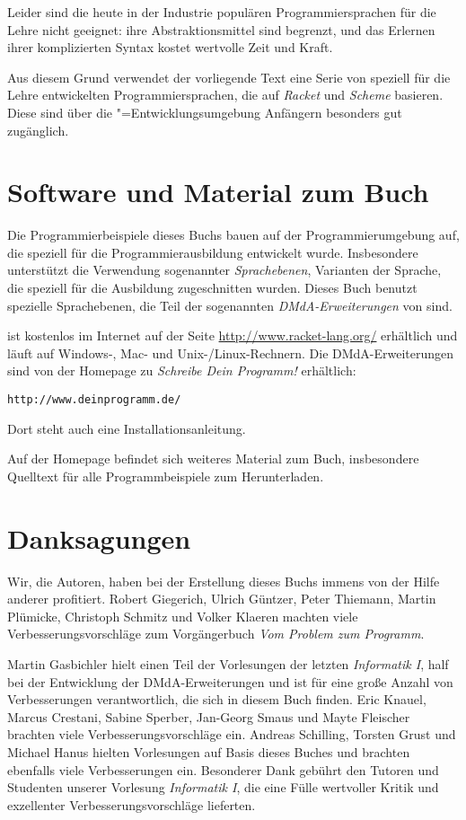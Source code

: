 Leider sind die heute in der Industrie populären Programmiersprachen
für die Lehre nicht geeignet: ihre
Abstraktionsmittel sind begrenzt, und das Erlernen ihrer komplizierten Syntax 
kostet wertvolle Zeit und Kraft.

Aus diesem Grund verwendet der vorliegende Text eine Serie von
speziell für die Lehre entwickelten Programmiersprachen,
die auf \textit{Racket} und
\textit{Scheme} basieren.  Diese sind über die
\drscheme"=Entwicklungsumgebung Anfängern besonders gut zugänglich.

\section*{Software und Material zum Buch}

Die Programmierbeispiele dieses Buchs bauen auf der
Programmierumgebung \drscheme{}\index{\drscheme{}} auf, die speziell für die
Programmierausbildung entwickelt wurde.  Insbesondere unterstützt
\drscheme{} die Verwendung sogenannter \textit{Sprachebenen}, Varianten
der Sprache, die speziell für die Ausbildung zugeschnitten wurden.
Dieses Buch benutzt spezielle Sprachebenen, die Teil der sogenannten
\textit{DMdA-Erweiterungen} von \drscheme{} sind.

\drscheme{} ist kostenlos im Internet auf der Seite
\url{http://www.racket-lang.org/} erhältlich und läuft auf Windows-, Mac-
und Unix-/Linux-Rechnern.  Die DMdA-Erweiterungen sind von der
Homepage zu \textit{Schreibe Dein Programm!	} erhältlich:
%
\begin{verbatim}
http://www.deinprogramm.de/
\end{verbatim}
%
Dort steht auch eine Installationsanleitung.

Auf der Homepage befindet sich weiteres Material zum Buch,
insbesondere Quelltext für alle Programmbeispiele zum Herunterladen.
 
\section*{Danksagungen}

Wir, die Autoren, haben bei der Erstellung dieses Buchs immens von der
Hilfe anderer profitiert.  Robert Giegerich, Ulrich Güntzer, Peter
Thiemann, Martin Plümicke, Christoph Schmitz und Volker Klaeren
machten viele Verbesserungsvorschläge zum Vorgängerbuch \textit{Vom
  Problem zum Programm}.

Martin Gasbichler hielt einen Teil der Vorlesungen der letzten
\textit{Informatik I}, half bei der Entwicklung der DMdA-Erweiterungen
und ist für eine große Anzahl von Verbesserungen verantwortlich, die
sich in diesem Buch finden.  Eric Knauel, Marcus Crestani, Sabine
Sperber, Jan-Georg Smaus und Mayte Fleischer brachten viele Verbesserungsvorschläge
ein.  Andreas Schilling, Torsten Grust und Michael Hanus hielten
Vorlesungen auf Basis dieses Buches und brachten ebenfalls viele
Verbesserungen ein.
Besonderer Dank gebührt den Tutoren und Studenten unserer Vorlesung
\textit{Informatik I}, die eine
Fülle wertvoller Kritik und exzellenter Verbesserungsvorschläge
lieferten.

